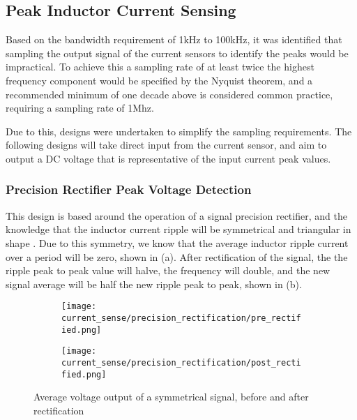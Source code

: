\subsection{Peak Inductor Current Sensing}\label{S:peak_current_design}

Based on the bandwidth requirement of 1kHz to 100kHz, it was identified that sampling the output signal of the current sensors to identify the peaks would be impractical. To achieve this a sampling rate of at least twice the highest frequency component would be specified by the Nyquist theorem, and a recommended minimum of one decade above is considered common practice, requiring a sampling rate of 1Mhz. 

Due to this, designs were undertaken to simplify the sampling requirements. The following designs will take direct input from the current sensor, and aim to output a DC voltage that is representative of the input current peak values. 


\subsubsection*{Precision Rectifier Peak Voltage Detection}\label{S:current_sense_precision_rectifier_design}

This design is based around the operation of a signal precision rectifier, and the knowledge that the inductor current ripple will be symmetrical and triangular in shape \cite{Mohan2012_Design}. Due to this symmetry, we know that the average inductor ripple current over a period will be zero, shown in  (a). After rectification of the signal, the the ripple peak to peak value will halve, the frequency will double, and the new signal average will be half the new ripple peak to peak, shown in  (b). 

\begin{figure}[H]
    
    \centering
    \begin{subfigure}{0.49\textwidth}
        \texttt{[image: current\_sense/precision\_rectification/pre\_rectified.png]}
    \end{subfigure}
    \begin{subfigure}{0.49\textwidth}
        \texttt{[image: current\_sense/precision\_rectification/post\_rectified.png]}
    \end{subfigure}
    \caption{Average voltage output of a symmetrical signal, before and after rectification}
    \label{F:rectification}
\end{figure}

